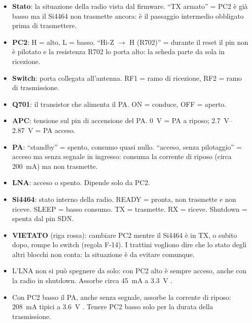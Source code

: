 \begin{nota}
\begin{itemize}
\item \textbf{Stato}: la situazione della radio vista dal firmware. \enquote{TX armato} = PC2 è già basso ma il Si4464 non trasmette ancora: è il passaggio intermedio obbligato prima di trasmettere.
\item \textbf{PC2}: H = alto, L = basso. \enquote{Hi-Z $\to$ H (R702)} = durante il reset il pin non è pilotato e la resistenza R702 lo porta alto: la scheda parte da sola in ricezione.
\item \textbf{Switch}: porta collegata all'antenna. RF1 = ramo di ricezione, RF2 = ramo di trasmissione.
\item \textbf{Q701}: il transistor che alimenta il PA. ON = conduce, OFF = aperto.
\item \textbf{APC}: tensione sul pin di accensione del PA. \SI{0}{\volt} = PA a riposo; \SIrange{2.7}{2.87}{\volt} = PA acceso.
\item \textbf{PA}: \enquote{standby} = spento, consumo quasi nullo. \enquote{acceso, senza pilotaggio} = acceso ma senza segnale in ingresso: consuma la corrente di riposo (circa \SI{200}{\milli\ampere}) ma non trasmette.
\item \textbf{LNA}: acceso o spento. Dipende solo da PC2.
\item \textbf{Si4464}: stato interno della radio. READY = pronta, non trasmette e non riceve. SLEEP = basso consumo. TX = trasmette. RX = riceve. Shutdown = spenta dal pin SDN.
\item \textbf{VIETATO} (riga rossa): cambiare PC2 mentre il Si4464 è in TX, o subito dopo, rompe lo switch (regola F-14). I trattini vogliono dire che lo stato degli altri blocchi non conta: la situazione è da evitare comunque.
\end{itemize}
\end{nota}

\begin{nota}
\begin{itemize}
\item L'LNA non si può spegnere da solo: con PC2 alto è sempre acceso, anche con la radio in shutdown. Assorbe circa \SI{45}{\milli\ampere} a \SI{3.3}{\volt} .
\item Con PC2 basso il PA, anche senza segnale, assorbe la corrente di riposo: \SI{208}{\milli\ampere} tipici a \SI{3.6}{\volt} . Tenere PC2 basso solo per la durata della trasmissione.
\end{itemize}
\end{nota}

